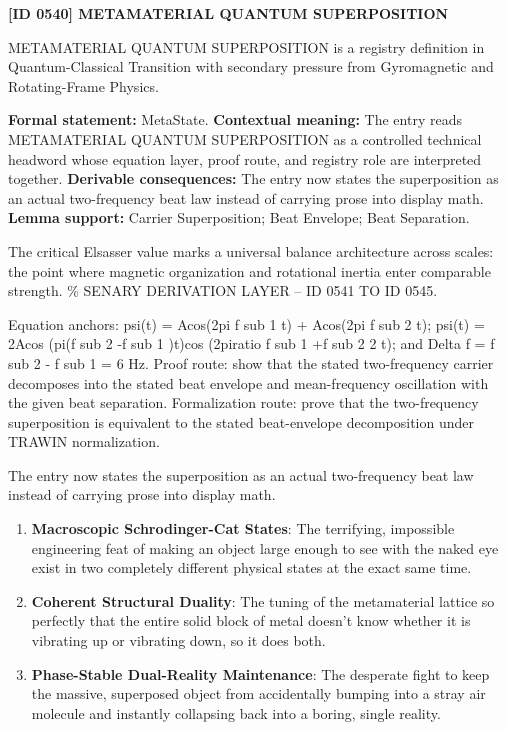 \clearpage
\noindent\textbf{[ID 0540] METAMATERIAL QUANTUM SUPERPOSITION}\par
\vspace{0.35em}
\begingroup\small
{}
METAMATERIAL QUANTUM SUPERPOSITION is a registry definition in Quantum-Classical Transition with secondary pressure from Gyromagnetic and Rotating-Frame Physics.

\begingroup\footnotesize\setlength{\emergencystretch}{3em}\sloppy
\textbf{Formal statement:} MetaState. \textbf{Contextual meaning:} The entry reads METAMATERIAL QUANTUM SUPERPOSITION as a controlled technical headword whose equation layer, proof route, and registry role are interpreted together. \textbf{Derivable consequences:} The entry now states the superposition as an actual two-frequency beat law instead of carrying prose into display math. \textbf{Lemma support:} Carrier Superposition; Beat Envelope; Beat Separation.\par
\endgroup

The critical Elsasser value marks a universal balance architecture across scales: the point where magnetic organization and rotational inertia enter comparable strength. \% SENARY DERIVATION LAYER -- ID 0541 TO ID 0545.

Equation anchors: psi(t) = Acos(2pi f sub 1 t) + Acos(2pi f sub 2 t); psi(t) = 2Acos (pi(f sub 2 -f sub 1 )t)cos (2piratio f sub 1 +f sub 2 2 t); and Delta f = f sub 2 - f sub 1 = 6 Hz. Proof route: show that the stated two-frequency carrier decomposes into the stated beat envelope and mean-frequency oscillation with the given beat separation. Formalization route: prove that the two-frequency superposition is equivalent to the stated beat-envelope decomposition under TRAWIN normalization.

The entry now states the superposition as an actual two-frequency beat law instead of carrying prose into display math.
\endgroup

\begin{enumerate}[leftmargin=1.6em,itemsep=6pt,topsep=4pt]
\item \textbf{Macroscopic Schrodinger-Cat States}: The terrifying, impossible engineering feat of making an object large enough to see with the naked eye exist in two completely different physical states at the exact same time.
\item \textbf{Coherent Structural Duality}: The tuning of the metamaterial lattice so perfectly that the entire solid block of metal doesn't know whether it is vibrating up or vibrating down, so it does both.
\item \textbf{Phase-Stable Dual-Reality Maintenance}: The desperate fight to keep the massive, superposed object from accidentally bumping into a stray air molecule and instantly collapsing back into a boring, single reality.
\end{enumerate}

